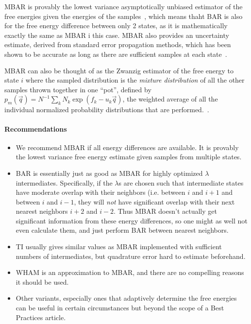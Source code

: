 \documentclass[9pt,bestpractices]{livecoms}
\begin{document}
MBAR is provably the lowest variance asymptotically unbiased estimator of the free energies given the energies of the samples~\cite{tan2004likelihood}, which means thaht BAR is also for the free energy difference between only 2 states, as it is mathematically exactly the same as MBAR i this case. MBAR also provides an uncertainty estimate, derived from standard error propagation methods, which has been shown to be accurate as long as there are sufficient samples at each state~\cite{paliwal2011benchmark}.

MBAR can also be thought of as the Zwanzig estimator of the free energy to state $i$ where the sampled distribution is the \textit{mixture distribution} of all the other samples thrown together in one ``pot'', defined by $p_m(\vec{q}) = N^{-1} \sum_k  N_k \exp(f_k-u_k\vec{q})$, the weighted average of all the individual normalized probability distributions that are performed.~\cite{Shirts:AC:2017}.

\paragraph{Recommendations}

\begin{itemize}
\item We recommend MBAR if all energy differences are available. It is provably the lowest variance free energy estimate given samples from multiple states.
\item BAR is essentially just as good as MBAR for highly optimized $\lambda$ intermediates.  Specifically, if the $\lambda$s are chosen such that intermediate states have moderate overlap with their neighbors (i.e. between $i$ and $i+1$ and between $i$ and $i-1$, they will \textit{not} have significant overlap with their next nearest neighbors $i+2$ and $i-2$. Thus MBAR doesn't actually get significant information from these energy differences, so one might as well not even calculate them, and just perform BAR between nearest neighbors.~\cite{paliwal2011benchmark} 
\item TI usually gives similar values as MBAR implemented with sufficient numbers of intermediates, but quadrature error hard to estimate beforehand.~\cite{paliwal2011benchmark}
\item WHAM is an approximation to MBAR, and there are no compelling reasons it should be used. 
\item Other variants, especially ones that adaptively determine the free energies can be  useful in certain circumstances but beyond the scope of a Best Practices article.
\end{itemize}
\end{document}
